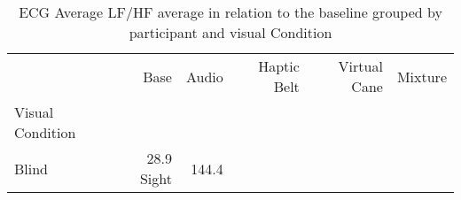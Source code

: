
\begin{table}[!htb]
\centering
\caption{ECG Average LF/HF average in relation to the baseline grouped by participant and visual Condition}
\label{tab:ecg_lfhf_average_group}
\begin{tabular}{lrrrrr}
\toprule
{} &    Base &   Audio & Haptic Belt & Virtual Cane & Mixture \\
Visual Condition &         &         &             &              &         \\
\midrule
Blind            &   28.9%
Sight            &  144.4%
\bottomrule
\end{tabular}
\end{table}

